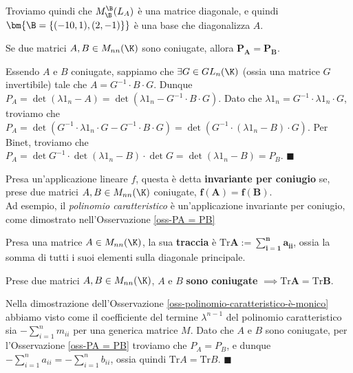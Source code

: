 \documentclass[11pt, a4paper, titlepage, oneside]{scrbook}
\begin{document}
Troviamo quindi che $M_\B^\B(L_A)$ è una matrice diagonale, e quindi $\bm{\B = \{(-10,1), (2,-1)\}}$ è una base che diagonalizza $A$.

\begin{Osservazione}[]
\label{oss-PA = PB}
Se due matrici $A,B \in M_{nn}(\K)$ sono coniugate, allora $\bm{P_A = P_B}$.
\end{Osservazione}

\Dimostrazione \nopagebreak

Essendo $A$ e $B$ coniugate, sappiamo che $\exists G \in GL_n(\K)$ (ossia una matrice $G$ invertibile) tale che $A = G^{-1} \cdot B \cdot G$. Dunque \mbox{$P_A = \det (\lambda 1_n - A) = \det(\lambda 1_n - G^{-1} \cdot B \cdot G)$}. Dato che $\lambda 1_n = G^{-1} \cdot \lambda 1_n \cdot G$, troviamo che $P_A = \det(G^{-1} \cdot \lambda 1_n \cdot G - G^{-1} \cdot B \cdot G) = \det (G^{-1} \cdot (\lambda 1_n - B)\cdot G)$. Per Binet, troviamo che $P_A = \det G^{-1} \cdot \det(\lambda 1_n - B) \cdot \det G = \det (\lambda 1_n - B) = P_B$. $\blacksquare$

\begin{Definizione}
\label{def-invariante-per-coniugio}
Presa un'applicazione lineare $f$, questa è detta \textbf{invariante per coniugio} se, prese due matrici $A,B \in M_{nn}(\K)$ coniugate, $\bm{f(A) = f(B)}$. \\
Ad esempio, il \textit{polinomio caratteristico} è un'applicazione invariante per coniugio, come dimostrato nell'Osservazione \ref{oss-PA = PB}
\end{Definizione}

\begin{Definizione}[Traccia]
\label{def-traccia}
Presa una matrice $A \in M_{nn}(\K)$, la sua \textbf{traccia} è $\bm{\mathrm{Tr}A := \sum_{i = 1}^n a_{ii}}$, ossia la somma di tutti i suoi elementi sulla diagonale principale.
\end{Definizione}

\begin{Proposizione}[]
\label{propos-matrici-coniugate-traccia-uguale}
Prese due matrici $A,B \in M_{nn}(\K)$, $A$ e $B$ \textbf{sono coniugate} $\implies \bm{\mathrm{Tr} A = \mathrm{Tr} B}$.
\end{Proposizione}

\Dimostrazione \nopagebreak

Nella dimostrazione dell'Osservazione \ref{oss-polinomio-caratteristico-è-monico} abbiamo visto come il coefficiente del termine $\lambda^{n-1}$ del polinomio caratteristico sia $-\sum_{i = 1}^n m_{ii}$ per una generica matrice $M$. Dato che $A$ e $B$ sono coniugate, per l'Osservazione \ref{oss-PA = PB} troviamo che $P_A = P_B$, e dunque $-\sum_{i = 1}^n a_{ii} = -\sum_{i = 1}^n b_{ii}$, ossia quindi $\mathrm{Tr}A = \mathrm{Tr}B$. $\blacksquare$ 
\end{document}
